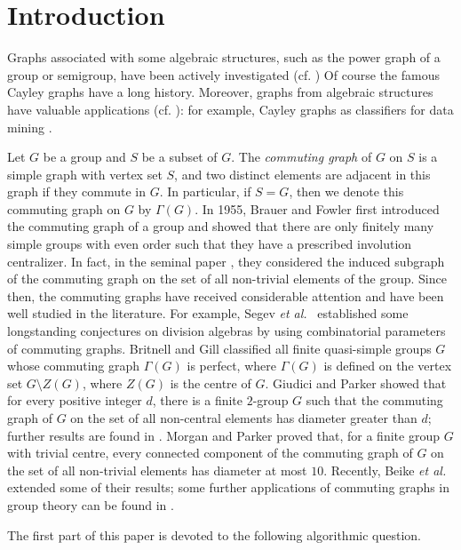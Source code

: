 \documentclass{elsarticle}
\begin{document}
\section{Introduction}

Graphs associated with some algebraic structures, such as the power graph of a group or semigroup, have been actively investigated (cf. \cite{AKC,Cam10,CGh, CaMas}) Of course the famous Cayley graphs have a long history. Moreover, graphs from algebraic structures
have valuable applications (cf. \cite{Kelbook}): for example, Cayley graphs as classifiers for data mining \cite{KeR}.

Let $G$ be a group and $S$ be a subset of $G$. The {\em commuting
  graph} of $G$ on $S$ is a simple graph with vertex set $S$, and two
distinct elements are adjacent in this graph if they commute in
$G$. In particular, if $S=G$, then we denote this commuting graph on
$G$ by $\Gamma(G)$. In 1955, Brauer and Fowler \cite{BF55} first
introduced the commuting graph of a group and showed that there are
only finitely many simple groups with even order such that they have a
prescribed involution centralizer. In fact, in the seminal paper
\cite{BF55}, they considered the induced subgraph of the commuting
graph on the set of all non-trivial elements of the group.  Since
then, the commuting graphs have received considerable attention and
have been well studied in the literature.  For example, Segev {\em et
  al.}~\cite{Com4,Com5,Com6} established some long\-standing
conjectures on division algebras by using combinatorial
parameters of commuting graphs.  Britnell and Gill \cite{Br17}
classified all finite quasi-simple groups $G$ whose commuting graph
$\Gamma(G)$ is perfect, where $\Gamma(G)$ is defined on the vertex set
$G\setminus Z(G)$, where $Z(G)$ is the centre of $G$. Giudici and
Parker \cite{GiP} showed that for every positive integer $d$, there is
a finite $2$-group $G$ such that the commuting graph of $G$ on the set
of all non-central elements has diameter greater than $d$; further
results are found in \cite{Cu22}.  Morgan and Parker \cite{MoP} proved
that, for a finite group $G$ with trivial centre, every connected
component of the commuting graph of $G$ on the set of all non-trivial
elements has diameter at most $10$.  Recently, Beike {\em et
  al.}~\cite{Bei} extended some of their results; some further
applications of commuting graphs in group theory can be found in
\cite{GGsurvey}.

The first part of this paper is devoted to the following algorithmic
question.
\end{document}
